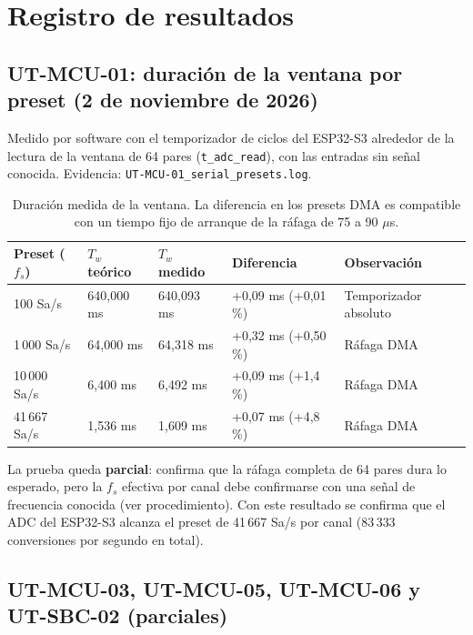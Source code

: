 \documentclass[12pt,a4paper]{article}
\begin{document}
\section{Registro de resultados}
\label{sec:resultados}

\subsection{UT-MCU-01: duración de la ventana por preset (2 de noviembre de 2026)}

Medido por software con el temporizador de ciclos del ESP32-S3 alrededor de la lectura de la ventana de 64 pares (\texttt{t\_adc\_read}), con las entradas sin señal conocida. Evidencia: \texttt{UT-MCU-01\_serial\_presets.log}.

\begin{table}[H]
\centering
\small
\begin{tabular}{@{}p{2.4cm} p{2.6cm} p{2.6cm} p{2.4cm} p{3.4cm}@{}}
\toprule
\textbf{Preset ($f_s$)} & \textbf{$T_w$ teórico} & \textbf{$T_w$ medido} & \textbf{Diferencia} & \textbf{Observación} \\
\midrule
100 Sa/s     & 640{,}000 ms & 640{,}093 ms & +0{,}09 ms (+0{,}01\,\%) & Temporizador absoluto \\
1\,000 Sa/s  & 64{,}000 ms  & 64{,}318 ms  & +0{,}32 ms (+0{,}50\,\%) & Ráfaga DMA \\
10\,000 Sa/s & 6{,}400 ms   & 6{,}492 ms   & +0{,}09 ms (+1{,}4\,\%)  & Ráfaga DMA \\
41\,667 Sa/s & 1{,}536 ms   & 1{,}609 ms   & +0{,}07 ms (+4{,}8\,\%)  & Ráfaga DMA \\
\bottomrule
\end{tabular}
\caption{Duración medida de la ventana. La diferencia en los presets DMA es compatible con un tiempo fijo de arranque de la ráfaga de 75 a 90 $\mu$s.}
\end{table}

La prueba queda \textbf{parcial}: confirma que la ráfaga completa de 64 pares dura lo esperado, pero la $f_s$ efectiva por canal debe confirmarse con una señal de frecuencia conocida (ver procedimiento). Con este resultado se confirma que el ADC del ESP32-S3 alcanza el preset de 41\,667 Sa/s por canal (83\,333 conversiones por segundo en total).

\subsection{UT-MCU-03, UT-MCU-05, UT-MCU-06 y UT-SBC-02 (parciales)}
\end{document}
